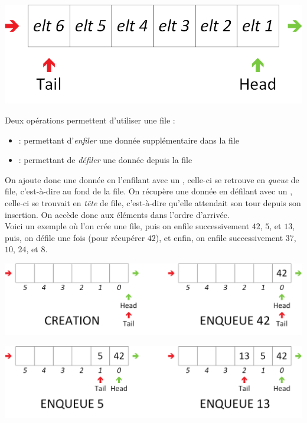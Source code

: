 \begin{center}
\includegraphics[scale=0.75]{Cours/Files_1_Structure_Generale.png}
\end{center}

\smallskip

Deux opérations permettent d'utiliser une file :
\begin{itemize}
\item {} : permettant d'\textit{enfiler} une donnée supplémentaire dans la file
\item {} : permettant de \textit{défiler} une donnée depuis la file
\end{itemize}
On ajoute donc une donnée en l'enfilant avec un , celle-ci se retrouve en \textit{queue} de file, c'est-à-dire au fond de la file.
On récupère une donnée en défilant avec un , celle-ci se trouvait en \textit{tête} de file, c'est-à-dire qu'elle attendait son tour depuis son insertion.
On accède donc aux éléments dans l'ordre d'arrivée.\\

Voici un exemple où l'on crée une file, puis on enfile successivement $ 42 $, $ 5 $, et $ 13 $, puis, on défile une fois (pour récupérer $ 42 $), et enfin, on enfile successivement $ 37 $, $ 10 $, $ 24 $, et $ 8 $.\\

\begin{center}
\includegraphics[scale=0.65]{Cours/Files_2_Structure_Generale_Usage_pack_1.png}
\end{center}

\begin{center}
\includegraphics[scale=0.65]{Cours/Files_2_Structure_Generale_Usage_pack_2.png}
\end{center}


